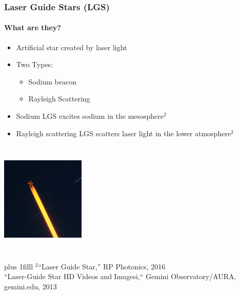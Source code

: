 \documentclass{beamer}
\newcommand{\btVFill}{\vskip0pt plus 1filll}
\begin{document}
\begin{frame}
  \frametitle{Laser Guide Stars (LGS)}
  \framesubtitle{What are they?}
  \begin{minipage}{.6\textwidth}
  \begin{itemize}
	\item Artificial star created by laser light\\
	\item Two Types:\\
	  \begin{itemize}
		\item Sodium beacon
		\item Rayleigh Scattering
	  \end{itemize}
	\item Sodium LGS excites sodium in the mesosphere$^2$
	\item Rayleigh scattering LGS scatters laser light in the lower atmosphere$^2$
	  
  \end{itemize}
\end{minipage}
\begin{minipage}{.35\textwidth}
  \includegraphics[width = 4cm, height = 5.5cm]{Images/lgs_insky.jpg}
  \end{minipage}
	  \bigskip
	  \btVFill
	  {\tiny  $^2$``Laser Guide Star,'' RP Photonics, 2016}\\
	  {\tiny ``Laser-Guide Star HD Videos and Imagesi,`` Gemini Observatory/AURA, gemini.edu, 2013 }\\
\end{frame}
\end{document}
